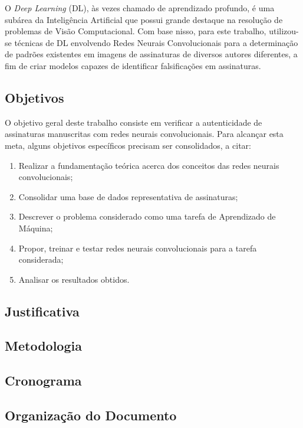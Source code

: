 O \emph{Deep Learning} (DL), às vezes chamado de aprendizado profundo, é uma subárea da Inteligência Artificial que possui grande destaque na resolução de problemas de Visão Computacional. Com base nisso, para este trabalho, utilizou-se técnicas de DL envolvendo Redes Neurais Convolucionais para a determinação de padrões existentes em imagens de assinaturas de diversos autores diferentes, a fim de criar modelos capazes de identificar falsificações em assinaturas.


\subsection{Objetivos}

O objetivo geral deste trabalho consiste em verificar a autenticidade de assinaturas manuscritas com redes neurais convolucionais. Para alcançar esta meta, alguns objetivos específicos precisam ser consolidados, a citar:

\begin{enumerate}
  \item Realizar a fundamentação teórica acerca dos conceitos das redes neurais convolucionais;
  \item Consolidar uma base de dados representativa de assinaturas;
  \item Descrever o problema considerado como uma tarefa de Aprendizado de Máquina;
  \item Propor, treinar e testar redes neurais convolucionais para a tarefa considerada;
  \item Analisar os resultados obtidos.
\end{enumerate}

\subsection{Justificativa}



\subsection{Metodologia}


\subsection{Cronograma}



\subsection{Organização do Documento}


